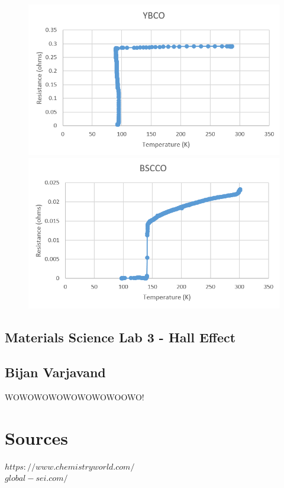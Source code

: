 \documentclass{article}
\begin{document}
\begin{figure}[h!]
\centering
\includegraphics[scale=0.4]{YBCO.png}
\includegraphics[scale=0.4]{BSCCO.png}
\end{figure}

\clearpage
\begin{center}
\section*{Materials Science Lab 3 - Hall Effect}
\subsection*{Bijan Varjavand}
\end{center}

WOWOWOWOWOWOWOWOOWO!

\clearpage
\section*{Sources}
$https://www.chemistryworld.com/$\\
$global-sei.com/$
\end{document}
